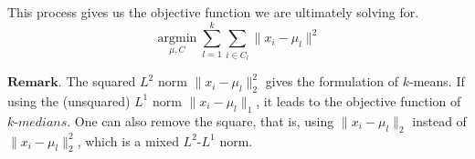 \documentclass[12pt]{article}
\theoremstyle{plain}
\begin{document}
This process gives us the objective function we are ultimately solving for.
$$\underset{\mu, C}{\operatorname{argmin}}  \sum_{l = 1}^k \sum_{i \in C_l} \| x_i - \mu_l \|^2$$

$\textbf{Remark}$.
The squared $L^2$ norm $\| x_i - \mu_l \|_2^2$ gives the formulation of $k$-means. If using the (unsquared) $L^1$ norm $\| x_i - \mu_l \|_1$, it leads to the objective function of $\textit{k-medians}$. One can also remove the square, that is, using $\| x_i - \mu_l \|_2$ instead of $\| x_i - \mu_l \|_2^2$, which is a mixed $L^2$-$L^1$ norm.
\end{document}
